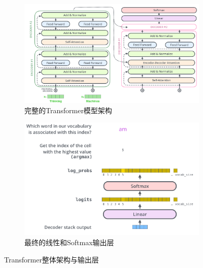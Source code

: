 \begin{figure}[H]
    \centering
    \begin{subfigure}[b]{0.48\textwidth}
        \centering
        \includegraphics[width=\textwidth]{figures/T9.png}
        \caption{完整的Transformer模型架构}
        \label{fig:transformer_architecture}
    \end{subfigure}
    \hfill
    \begin{subfigure}[b]{0.48\textwidth}
        \centering
        \includegraphics[width=\textwidth]{figures/T10.png}
        \caption{最终的线性和Softmax输出层}
        \label{fig:final_output_layer}
    \end{subfigure}
    \caption{Transformer整体架构与输出层}
    \label{fig:transformer_full_view}
\end{figure}

